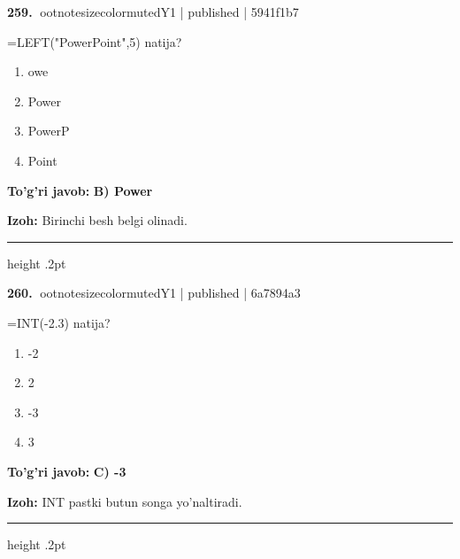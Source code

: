 \documentclass[10pt,a4paper]{article}
\begin{document}
\textbf{\color{ink}259.} {ootnotesizecolor{muted}Y1 | published | 5941f1b7}
\par
=LEFT("PowerPoint",5) natija?
\begin{enumerate}[label=\Alph*),leftmargin=9mm]
\item owe
\item Power
\item PowerP
\item Point
\end{enumerate}
\begin{tcolorbox}[enhanced,breakable,colback=teal!4,colframe=teal!55!black,boxrule=0.45pt,arc=1.2mm,left=2.8mm,right=2.8mm,top=2mm,bottom=2mm]
\textbf{\color{teal}To'g'ri javob:} \textbf{B) Power}
\par\smallskip
\textbf{Izoh:} Birinchi besh belgi olinadi.
\end{tcolorbox}
\vspace{2mm}\hrule height .2pt\vspace{2mm}

\textbf{\color{ink}260.} {ootnotesizecolor{muted}Y1 | published | 6a7894a3}
\par
=INT(-2.3) natija?
\begin{enumerate}[label=\Alph*),leftmargin=9mm]
\item -2
\item 2
\item -3
\item 3
\end{enumerate}
\begin{tcolorbox}[enhanced,breakable,colback=teal!4,colframe=teal!55!black,boxrule=0.45pt,arc=1.2mm,left=2.8mm,right=2.8mm,top=2mm,bottom=2mm]
\textbf{\color{teal}To'g'ri javob:} \textbf{C) -3}
\par\smallskip
\textbf{Izoh:} INT pastki butun songa yo'naltiradi.
\end{tcolorbox}
\vspace{2mm}\hrule height .2pt\vspace{2mm}
\end{document}
